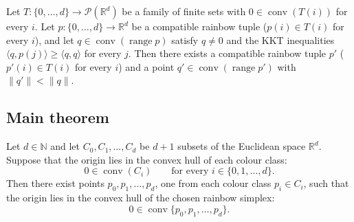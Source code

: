 \begin{lemma}
\label{lem:cc_replacement}
Let \(T : \{0,\dots,d\} \to \mathcal{P}(\mathbb{R}^d)\) be a family of
finite sets with \(0 \in \operatorname{conv}(T(i))\) for every \(i\).
Let \(p : \{0,\dots,d\} \to \mathbb{R}^d\) be a compatible rainbow
tuple (\(p(i) \in T(i)\) for every \(i\)), and let
\(q \in \operatorname{conv}(\operatorname{range} p)\) satisfy
\(q \neq 0\) and the KKT inequalities
\(\langle q, p(j) \rangle \ge \langle q, q \rangle\) for every \(j\).
Then there exists a compatible rainbow tuple \(p'\)
(\(p'(i) \in T(i)\) for every \(i\)) and a point
\(q' \in \operatorname{conv}(\operatorname{range} p')\) with
\(\|q'\| < \|q\|\).
\end{lemma}

\subsection*{Main theorem}

\begin{theorem}
\label{thm:colorful_caratheodory}
Let \(d \in \mathbb{N}\) and let \(C_0, C_1, \dots, C_d\) be \(d+1\)
subsets of the Euclidean space \(\mathbb{R}^d\). Suppose that the
origin lies in the convex hull of each colour class:
\[
0 \in \operatorname{conv}(C_i) \qquad \text{for every } i \in \{0, 1, \dots, d\}.
\]
Then there exist points \(p_0, p_1, \dots, p_d\), one from each colour
class \(p_i \in C_i\), such that the origin lies in the convex hull of
the chosen rainbow simplex:
\[
0 \in \operatorname{conv}\{p_0, p_1, \dots, p_d\}.
\]
\end{theorem}


